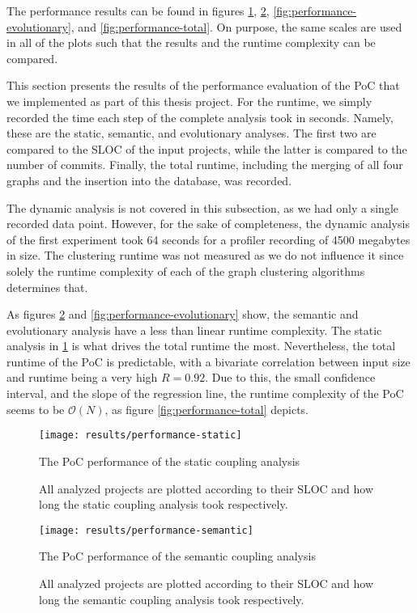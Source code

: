 \documentclass[12pt,a4paper]{report}
\begin{document}
The performance results can be found in figures \ref{fig:performance-static},
\ref{fig:performance-semantic}, \ref{fig:performance-evolutionary}, and
\ref{fig:performance-total}. On purpose, the same scales are used in all of the
plots such that the results and the runtime complexity can be compared.

This section presents the results of the performance evaluation of the PoC that
we implemented as part of this thesis project. For the runtime, we simply
recorded the time each step of the complete analysis took in seconds. Namely,
these are the static, semantic, and evolutionary analyses. The first two are
compared to the SLOC of the input projects, while the latter is compared to the
number of commits. Finally, the total runtime, including the merging of all
four graphs and the insertion into the database, was recorded.

The dynamic analysis is not covered in this subsection, as we had only a single
recorded data point. However, for the sake of completeness, the dynamic
analysis of the first experiment took 64 seconds for a profiler recording of
4500 megabytes in size. The clustering runtime was not measured as we do not
influence it since solely the runtime complexity of each of the graph
clustering algorithms determines that.

As figures \ref{fig:performance-semantic} and \ref{fig:performance-evolutionary}
show, the semantic and evolutionary analysis have a less than
linear runtime complexity. The static analysis in \ref{fig:performance-static}
is what drives the total runtime the most. Nevertheless, the total runtime of
the PoC is predictable, with a bivariate correlation between input size and
runtime being a very high \(R = 0.92\). Due to this, the small confidence
interval, and the slope of the regression line, the runtime complexity of the
PoC seems to be \(\mathcal{O}(N)\), as figure \ref{fig:performance-total}
depicts.

\begin{figure}[htbp]
\centering
\texttt{[image: results/performance-static]}
\caption{The PoC performance of the static coupling analysis}
\caption*{\centering
  All analyzed projects are plotted according to their SLOC
  and how long the static coupling analysis took respectively.
}
\label{fig:performance-static}
\end{figure}

\begin{figure}[htbp]
\centering
\texttt{[image: results/performance-semantic]}
\caption{The PoC performance of the semantic coupling analysis}
\caption*{\centering
  All analyzed projects are plotted according to their SLOC
  and how long the semantic coupling analysis took respectively.
}
\label{fig:performance-semantic}
\end{figure}
\end{document}
